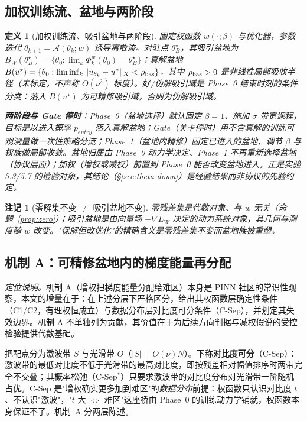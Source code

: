\documentclass[fontset=windows,11pt]{ctexart}
\newcommand{\W}{W}
\newtheorem{definition}{定义}[section]
\newtheorem*{remark}{注记}
\numberwithin{equation}{section}
\begin{document}
\subsection{加权训练流、盆地与两阶段}\label{sec:theta-flow}

\begin{definition}[加权训练流、吸引盆地与两阶段]\label{def:flow-basin}
固定权函数 $w(\cdot;\beta)$ 与优化器，参数迭代 $\theta_{k+1}=\mathcal A(\theta_k;w)$ 诱导离散流。对驻点 $\theta_B^\star$，其吸引盆地为 $B_{\W}(\theta_B^\star)=\{\theta_0:\lim_k\Phi_k^w(\theta_0)=\theta_B^\star\}$；\emph{真解盆地} $B(u^\star)=\{\theta_0:\liminf_k\|u_{\theta_k}-u^*\|_X<\rho_{\rm bas}\}$，其中 $\rho_{\rm bas}>0$ 是非线性局部吸收半径（未标定，不声称 $O(\nu^2)$ 标度）。好/伪解吸引域是 Phase~0 结束时刻的条件分类：落入 $B(u^\star)$ 为可精修吸引域，否则为伪解吸引域。

\textbf{两阶段与 Gate 停时}：\emph{Phase~0（盆地选择）}默认固定 $\beta=1$、施加 $\sigma$ 带宽课程，目标是以进入概率 $p_{entry}$ 落入真解盆地；\emph{Gate（关卡停时）}用不含真解的训练可观测量做一次性策略分流；\emph{Phase~1（盆地内精修）}固定已进入的盆地、调节 $\beta$ 与权族做局部收敛。盆地归属由 Phase~0 动力学决定、Phase~1 不再重新选择盆地（协议层面）；加权（增权或减权）前置到 Phase~0 能否改变盆地进入，正是实验 5.3/5.7 的检验对象，其结论（§\ref{sec:theta-down}）是经验结果而非协议的先验约定。
\end{definition}

\begin{remark}[零解集不变 $\ne$ 吸引盆地不变]\label{rem:attractor}
零残差集是代数对象、与 $w$ 无关（命题~\ref{prop:zero}）；吸引盆地是由向量场 $-\nabla L_\W$ 决定的动力系统对象，其几何与测度随 $w$ 改变。"保解但改优化"的精确含义是零残差集不变而盆地族被重塑。
\end{remark}

\subsection{机制 A：可精修盆地内的梯度能量再分配}\label{sec:theta-mechA}

\noindent\emph{定位说明。}机制 A（增权把梯度能量分配给难区）本身是 PINN 社区的常识性观察，本文的增量在于：在上述分层下严格区分，给出其权函数层确定性条件（C1/C2，有理权恒成立）与数据分布层对比度可分条件（C-Sep），并划定其失效边界。机制 A 不单独列为贡献，其价值在于为后续方向判据与减权假说的受控检验提供代数基础。

把配点分为激波带 $S$ 与光滑带 $O$（$|S|=O(\nu)N$）。下称\textbf{对比度可分}（C-Sep）：激波带的最低对比度不低于光滑带的最高对比度，即按残差相对幅值排序时两带完全不交叠；其概率松弛（C-Sep$^*$）只要求激波带的对比度分布对光滑带一阶随机占优。C-Sep 是"增权确实更多加到难区"的\emph{数据分布}前提：权函数只认识对比度 $t$、不认识"激波"，"$t$ 大 $\Leftrightarrow$ 难区"这座桥由 Phase~0 的训练动力学铺就，权函数本身保证不了。机制~A 分两层陈述。
\end{document}
